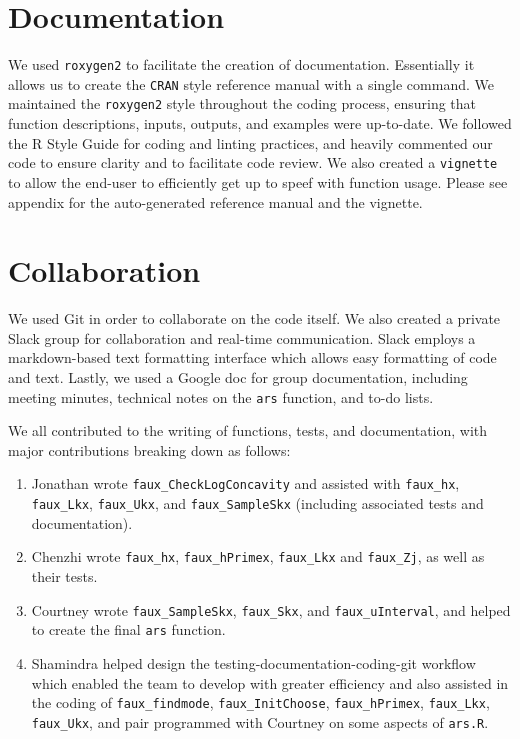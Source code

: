 \documentclass{article}\usepackage[]{graphicx}\usepackage[]{color}
\begin{document}
\section{Documentation}

We used \texttt{roxygen2} to facilitate the creation of documentation. 
Essentially it allows us to create the \texttt{CRAN} style reference manual with 
a single command. We maintained the \texttt{roxygen2} style throughout the coding process, 
ensuring that function descriptions, inputs, outputs, and examples were up-to-date.
We followed the R Style Guide for coding and linting practices,
and heavily commented our code to ensure clarity and to facilitate code
review. We also created a \texttt{vignette} to allow the end-user to efficiently
get up to speef with function usage. Please see appendix for the auto-generated 
reference manual and the vignette.

\section{Collaboration}

We used Git in order to collaborate on the code itself. We also created a
private Slack group for collaboration and real-time communication.
Slack employs a markdown-based text formatting interface which allows
easy formatting of code and text.
Lastly, we used a Google doc for group documentation, including
meeting minutes, technical notes on the \texttt{ars} function,
and to-do lists.

We all contributed to the writing of functions, tests, and documentation,
with major contributions breaking down as follows:
\begin{enumerate}
	\item Jonathan wrote \texttt{faux\_CheckLogConcavity} and assisted with
	\texttt{faux\_hx}, \texttt{faux\_Lkx}, \texttt{faux\_Ukx}, and
	\texttt{faux\_SampleSkx} (including associated tests and documentation).
	\item Chenzhi wrote \texttt{faux\_hx}, \texttt{faux\_hPrimex}, \texttt{faux\_Lkx}    and \texttt{faux\_Zj}, as well as their tests.
	\item Courtney wrote \texttt{faux\_SampleSkx}, \texttt{faux\_Skx}, and
	\texttt{faux\_uInterval}, and helped to create the final \texttt{ars} function.
	\item Shamindra helped design the testing-documentation-coding-git workflow
    which enabled the team to develop with greater efficiency and also assisted 
    in the coding of \texttt{faux\_findmode}, \texttt{faux\_InitChoose}, \texttt{faux\_hPrimex}, 
    \texttt{faux\_Lkx}, \texttt{faux\_Ukx}, and pair programmed with Courtney on some aspects of \texttt{ars.R}.
\end{enumerate}
\end{document}
